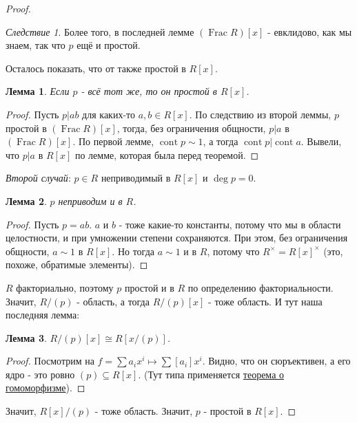 \documentclass[a4paper,100pt]{article}
\theoremstyle{indented}
\newtheorem{lemma}{Лемма}
\theoremstyle{definition}
\theoremstyle{remark}
\newtheorem{cons}{Следствие}
\DeclareMathOperator{\Frac}{Frac}
\DeclareMathOperator{\cont}{cont}
\begin{document}
\begin{proof}
    \begin{cons}
        Более того, в последней лемме $(\Frac R)[x]$ - евклидово, как мы знаем, так что $p$ ещё и простой.
    \end{cons}

    Осталось показать, что от также простой в $R[x]$.\\

    \begin{lemma}
        Если $p$ - всё тот же, то он простой в $R[x]$.
    \end{lemma}

    \begin{proof}
        Пусть $p\vert ab$ для каких-то $a,b\in R[x]$. По следствию из второй леммы, $p$ простой в $(\Frac R)[x]$, тогда, без ограничения общности, $p\vert a$ в $(\Frac R)[x]$. По первой лемме, $\cont p\sim 1$, а тогда $\cont p\vert \cont a$. Вывели, что $p\vert a$ в  $R[x]$ по лемме, которая была перед теоремой.
    \end{proof}

    \textit{Второй случай}: $p\in R$ неприводимый в $R[x]$ и $\deg p=0$.\\

    \begin{lemma}
        $p$ неприводим и в $R$.
    \end{lemma}

    \begin{proof}
        Пусть $p=ab$. $a$ и $b$ - тоже какие-то константы, потому что мы в области целостности, и при умножении степени сохраняются. При этом, без ограничения общности, $a\sim 1$ в $R[x]$. Но тогда $a\sim 1$ и в $R$, потому что $R^{\times}=R[x]^{\times}$ (это, похоже, обратимые элементы).
    \end{proof}

    $R$ факториально, поэтому $p$ простой и в $R$ по определению факториальности. Значит, $R/(p)$ - область, а тогда $R/(p)[x]$ - тоже область. И тут наша последняя лемма:\\

    \begin{lemma}
        $R/(p)[x]\cong R[x/(p)]$.
    \end{lemma}

    \begin{proof}
        Посмотрим на $f=\sum a_i x^i \mapsto \sum [a_i]x^i$. Видно, что он сюръективен, а его ядро - это ровно $(p)\subseteq R[x]$. (Тут типа применяется \hyperlink{n25}{теорема о гомоморфизме}).
    \end{proof}

    Значит, $R[x]/(p)$ - тоже область. Значит, $p$ - простой в $R[x]$.

\end{proof}
\end{document}
